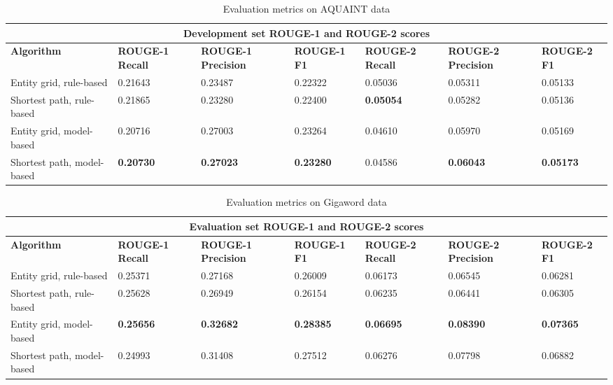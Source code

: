 \documentclass[11pt]{article}
\begin{document}
\begin{table}[h]
\begin{tabular}{|p{4.3cm}||p{1.735cm}|p{1.78cm}|p{1.735cm}|p{1.735cm}|p{1.78cm}|p{1.735cm}| }
 \hline
 \multicolumn{7}{|c|}{Development set ROUGE-1 and ROUGE-2 scores} \\
 \hline
 \textbf{Algorithm} & \textbf{ROUGE-1 Recall} & \textbf{ROUGE-1 Precision} & \textbf{ROUGE-1 F1} & \textbf{ROUGE-2 Recall} & \textbf{ROUGE-2 Precision} & \textbf{ROUGE-2 F1}\\
 \hline
Entity grid, rule-based & 0.21643 & 0.23487 & 0.22322 & 0.05036 & 0.05311 & 0.05133 \\
Shortest path, rule-based & 0.21865 & 0.23280 & 0.22400 & \textbf{0.05054} & 0.05282 & 0.05136 \\
Entity grid, model-based & 0.20716 & 0.27003 & 0.23264 & 0.04610 & 0.05970 & 0.05169 \\
Shortest path, model-based & \textbf{0.20730} & \textbf{0.27023} & \textbf{0.23280} & 0.04586 & \textbf{0.06043} & \textbf{0.05173} \\
\hline
\end{tabular}
\caption{Evaluation metrics on AQUAINT data}
\label{tab:dev} 
\end{table}

\begin{table}[h]
\begin{tabular}{|p{4.3cm}||p{1.735cm}|p{1.78cm}|p{1.735cm}|p{1.735cm}|p{1.78cm}|p{1.735cm}| }
 \hline
 \multicolumn{7}{|c|}{Evaluation set ROUGE-1 and ROUGE-2 scores} \\
 \hline
 \textbf{Algorithm} & \textbf{ROUGE-1 Recall} & \textbf{ROUGE-1 Precision} & \textbf{ROUGE-1 F1} & \textbf{ROUGE-2 Recall} & \textbf{ROUGE-2 Precision} & \textbf{ROUGE-2 F1}\\
 \hline
Entity grid, rule-based & 0.25371 & 0.27168 & 0.26009 & 0.06173 & 0.06545 & 0.06281 \\
Shortest path, rule-based & 0.25628 & 0.26949 & 0.26154 & 0.06235 & 0.06441 & 0.06305 \\
Entity grid, model-based & \textbf{0.25656} & \textbf{0.32682} & \textbf{0.28385} & \textbf{0.06695} & \textbf{0.08390} & \textbf{0.07365} \\
Shortest path, model-based & 0.24993 & 0.31408 & 0.27512 & 0.06276 & 0.07798 & 0.06882 \\
\hline
\end{tabular}
\caption{Evaluation metrics on Gigaword data}
\label{tab:dev} 
\end{table}
\end{document}
